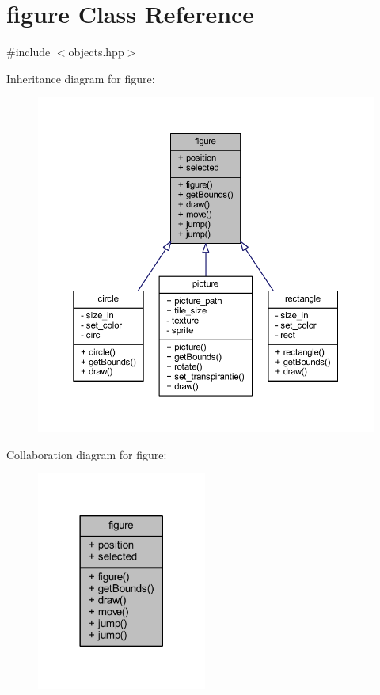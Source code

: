 \hypertarget{classfigure}{}\section{figure Class Reference}
\label{classfigure}


{\ttfamily \#include $<$objects.\+hpp$>$}



Inheritance diagram for figure\+:
\nopagebreak
\begin{figure}[H]
\begin{center}
\leavevmode
\includegraphics[width=350pt]{classfigure__inherit__graph}
\end{center}
\end{figure}


Collaboration diagram for figure\+:
\nopagebreak
\begin{figure}[H]
\begin{center}
\leavevmode
\includegraphics[width=158pt]{classfigure__coll__graph}
\end{center}
\end{figure}
